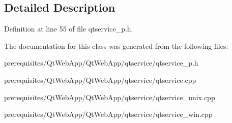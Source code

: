 \subsection{Detailed Description}


Definition at line 55 of file qtservice\+\_\+p.\+h.



The documentation for this class was generated from the following files\+:\begin{DoxyCompactItemize}
\item 
prerequisites/\+Qt\+Web\+App/\+Qt\+Web\+App/qtservice/qtservice\+\_\+p.\+h\item 
prerequisites/\+Qt\+Web\+App/\+Qt\+Web\+App/qtservice/qtservice.\+cpp\item 
prerequisites/\+Qt\+Web\+App/\+Qt\+Web\+App/qtservice/qtservice\+\_\+unix.\+cpp\item 
prerequisites/\+Qt\+Web\+App/\+Qt\+Web\+App/qtservice/qtservice\+\_\+win.\+cpp\end{DoxyCompactItemize}
